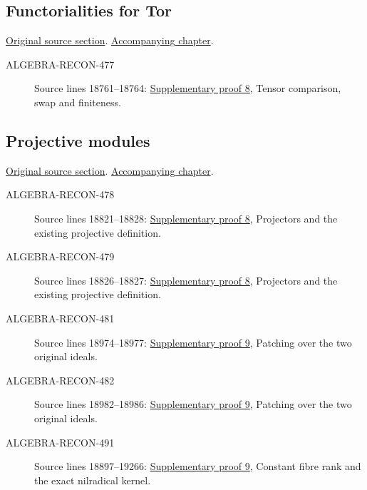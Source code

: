 \subsection{Functorialities for Tor}
\hypertarget{algebra-source-section-functoriality-tor}{}
\noindent\href{https://github.com/stacks/stacks-project/blob/a04446e57ec1fbc252a871afcec7752fb2807b14/algebra.tex\#L18713}{Original source section}. \href{algebra.pdf\#nameddest=section-functoriality-tor}{Accompanying chapter}.

\begin{description}
\item[ALGEBRA-RECON-477] Source lines 18761--18764: \hyperlink{algebra_depth_tor_projective_notes_20260927}{Supplementary proof 8}, Tensor comparison, swap and finiteness.
\end{description}

\subsection{Projective modules}
\hypertarget{algebra-source-section-projective}{}
\noindent\href{https://github.com/stacks/stacks-project/blob/a04446e57ec1fbc252a871afcec7752fb2807b14/algebra.tex\#L18774}{Original source section}. \href{algebra.pdf\#nameddest=section-projective}{Accompanying chapter}.

\begin{description}
\item[ALGEBRA-RECON-478] Source lines 18821--18828: \hyperlink{algebra_depth_tor_projective_notes_20260927}{Supplementary proof 8}, Projectors and the existing projective definition.
\item[ALGEBRA-RECON-479] Source lines 18826--18827: \hyperlink{algebra_depth_tor_projective_notes_20260927}{Supplementary proof 8}, Projectors and the existing projective definition.
\item[ALGEBRA-RECON-481] Source lines 18974--18977: \hyperlink{algebra_projective_lifting_notes_20260927}{Supplementary proof 9}, Patching over the two original ideals.
\item[ALGEBRA-RECON-482] Source lines 18982--18986: \hyperlink{algebra_projective_lifting_notes_20260927}{Supplementary proof 9}, Patching over the two original ideals.
\item[ALGEBRA-RECON-491] Source lines 18897--19266: \hyperlink{algebra_projective_lifting_notes_20260927}{Supplementary proof 9}, Constant fibre rank and the exact nilradical kernel.
\end{description}

